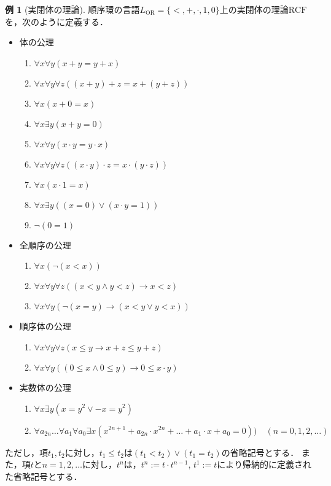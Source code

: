 \documentclass[uplatex, dvipdfmx]{jsarticle}
\numberwithin{equation}{section}
\newcommand{\RCF}{\mathrm{RCF}}
\theoremstyle{definition}
\newtheorem{example}[definition]{例}
\begin{document}
\begin{example}[実閉体の理論]
     順序環の言語$L_\mathrm{OR}=\{<, +, \cdot, 1, 0\}$上の実閉体の理論$\RCF$を，次のように定義する．
     
     \begin{itemize}
          \item 体の公理
          \begin{enumerate}
               \item $\forall x \forall y(x + y = y + x)$
               \item $\forall x \forall y \forall z((x + y) + z = x + (y + z))$
               \item $\forall x (x + 0 = x)$
               \item $\forall x \exists y (x + y = 0)$
               \item $\forall x \forall y(x \cdot y = y \cdot x)$
               \item $\forall x \forall y \forall z((x \cdot y) \cdot z = x \cdot (y \cdot z))$
               \item $\forall x (x \cdot 1 = x)$
               \item $\forall x \exists y ((x=0) \lor (x \cdot y = 1))$
               \item $\lnot(0 = 1)$
          \end{enumerate}
          \item 全順序の公理
          \begin{enumerate}
               \item $\forall x (\lnot(x<x))$
               \item $\forall x \forall y \forall z((x < y \land y < z) \rightarrow x < z)$
               \item $\forall x \forall y (\lnot(x = y) \rightarrow (x<y \lor y<x))$
          \end{enumerate}
          \item 順序体の公理
          \begin{enumerate}
               \item $\forall x \forall y \forall z (x \leq y \rightarrow x + z \leq y + z)$
               \item $\forall x \forall y ((0 \leq x \land 0 \leq y) \rightarrow 0 \leq x \cdot y )$
          \end{enumerate}
          \item 実数体の公理
          \begin{enumerate}
               \item $\forall x \exists y (x=y^2 \lor -x=y^2)$
               \item $\forall a_{2n} \dots \forall a_1 \forall a_0 \exists x(x^{2n+1} + a_{2n}\cdot x^{2n} + \dots +  a_1 \cdot x + a_0 = 0)) \quad (n=0,1,2,\dots)$ 
          \end{enumerate}
     \end{itemize}

     ただし，項$t_1, t_2$に対し，$t_1 \leq t_2$は$(t_1 < t_2)\lor(t_1 = t_2)$の省略記号とする．
     また，項$t$と$n=1,2,\dots$に対し，$t^n$は，$t^n:=t \cdot t^{n-1}$, $t^1:=t$により帰納的に定義された省略記号とする．
\end{example}
\end{document}
